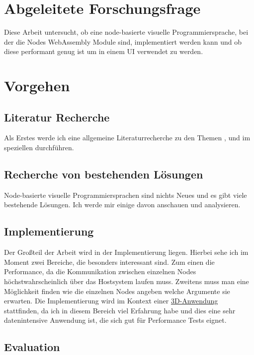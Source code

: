 \documentclass{article}
\begin{document}
\section{Abgeleitete Forschungsfrage}
Diese Arbeit untersucht, ob eine node-basierte visuelle Programmiersprache, bei der die Nodes WebAssembly Module sind, implementiert werden kann und ob diese performant genug ist um in einem UI verwendet zu werden.

\section{Vorgehen}
\subsection{Literatur Recherche}
Als Erstes werde ich eine allgemeine Literaturrecherche zu den Themen ,  und im speziellen  durchführen.

\subsection{Recherche von bestehenden Lösungen}
Node-basierte visuelle Programmiersprachen sind nichts Neues und es gibt viele bestehende Lösungen. Ich werde mir einige davon anschauen und analysieren.

\subsection{Implementierung}
Der Großteil der Arbeit wird in der Implementierung liegen. Hierbei sehe ich im Moment zwei Bereiche, die besonders interessant sind. Zum einen die Performance, da die Kommunikation zwischen einzelnen Nodes höchstwahrscheinlich über das Hostsystem laufen muss. Zweitens muss man eine Möglichkeit finden wie die einzelnen Nodes angeben welche Argumente sie erwarten. 
\linebreak
\linebreak
Die Implementierung wird im Kontext einer \href{https://plant.max-richter.dev}{3D-Anwendung} stattfinden, da ich in diesem Bereich viel Erfahrung habe und dies eine sehr datenintensive Anwendung ist, die sich gut für Performance Tests eignet.

\subsection{Evaluation}
\end{document}
